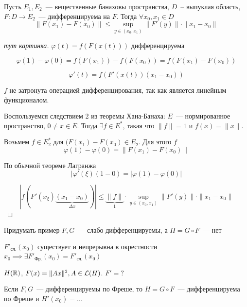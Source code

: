 \begin{theorem}\label{13.1}
Пусть $E_1, E_2$~--- вещественные банаховы пространства,  $D$~-- выпуклая область, $F: D \to E_2$~--- дифференцируема на $F$.
Тогда $\forall x_0, x_1 \in D$
\[
\|F(x_1) - F(x_0)\| \leqslant \sup_{y \in (x_0, x_1)}
\|F'(y)\| \cdot \|x_1 - x_0\|
\]
\end{theorem}

\begin{proof}
[тут картинка]
$\varphi(t) = f(F(x(t)))$ дифференцируема

\[
\varphi(1) - \varphi(0) = f(F(x_1)) - f(F(x_0)) = 
f(F(x_1) - F(x_0))
\]

\[
    \varphi'(t)=f(F'(x(t))(x_1-x_0))
\]

$f$ не затронута операцией дифференцирования, так как является линейным функционалом.

Воспользуемся следствием 2 из теоремы Хана-Банаха:
$E$~--- нормированное пространство, $0 \neq x \in E$.
Тогда $\exists f \in E^*$, такая что $\|f\| = 1$ и $f(x) = \|x\|$.

Возьмем $f \in E_2^*$ для $(F(x_1)-F(x_0) \in E_2$. Для этого $f$
\[
\varphi(1) - \varphi(0) = \|F(x_1) - F(x_0)\|
\]

По обычной теореме Лагранжа \[ |\varphi'(\xi)(1-0)=|\varphi(1)-\varphi(0)| \]

\[
|f(F'(x_{\xi}) \underbrace{(x_1 - x_0)}_{\Delta x})| \leqslant \underbrace{\|f\|}_{1} \cdot
\sup_{y \in (x_0, x_1)} \|F'(y)\| \cdot \|x_1 - x_0\|
\]

\end{proof}

\begin{exercise}
    Придумать пример $F, G$~--- слабо дифференцируемы, а $H=G \circ F$~--- нет
\end{exercise}

\begin{theorem}[13.2]
    $F'_{\text{сл.}}(x_0)$ существует и непрерывна в окрестности $x_0 \implies \exists F'_{\text{Фр.}}(x_0)=F'_{\text{сл.}}(x_0)$ 
\end{theorem}

\begin{exercise}
$H(\mathbb{R})$, $F(x) = \|Ax\|^2, A \in \mathcal{L}(H)$. $F' = ?$
\end{exercise}

\begin{statement}
    Если $F, G$~--- дифференцируемы по Фреше, то $H=G \circ F$~--- дифференцируема по Фреше и $H'(x_0)=...$
\end{statement}

